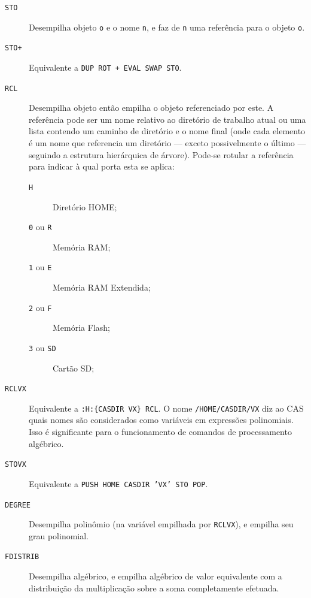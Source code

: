 \documentclass[12pt,a4paper]{report}
\newcommand{\kwd}[1]{\texttt{\textcolor{keyword}{#1}}}
\newcommand{\DUP}{\kwd{DUP}}   %
\newcommand{\SWAP}{\kwd{SWAP}}   %
\newcommand{\ROT}{\kwd{ROT}}   %
\newcommand{\PLUS}{\kwd{+}}   %
\newcommand{\PUSH}{\kwd{PUSH}}   %
\newcommand{\POP}{\kwd{POP}}   %
\newcommand{\HOME}{\kwd{HOME}}   %
\newcommand{\EVAL}{\kwd{EVAL}}   %
\newcommand{\DEGREE}{\kwd{DEGREE}}   %
\newcommand{\FDISTRIB}{\kwd{FDISTRIB}}   %
\newcommand{\STO}{\kwd{STO}} %
\newcommand{\STOPLUS}{\kwd{STO+}} %
\newcommand{\RCL}{\kwd{RCL}} %
\newcommand{\RCLVX}{\kwd{RCLVX}} %
\newcommand{\STOVX}{\kwd{STOVX}} %
\numberwithin{theorem}{chapter}
\begin{document}
\begin{description}

  \item[\STO]\label{STO} Desempilha objeto \texttt{o} e o nome
    \texttt{n}, e faz de \texttt{n} uma referência para o objeto
    \texttt{o}.

  \item[\STOPLUS]\label{STOPLUS} Equivalente a
    \DUP\ \ROT\ \PLUS\ \EVAL\ \SWAP\ \STO.

  \item[\RCL]\label{RCL} Desempilha objeto então empilha o objeto
    referenciado por este.  A referência pode ser um nome relativo ao
    diretório de trabalho atual ou uma lista contendo um caminho de
    diretório e o nome final (onde cada elemento é um nome que
    referencia um diretório --- exceto possivelmente o último ---
    seguindo a estrutura hierárquica de árvore).  Pode-se rotular a
    referência para indicar à qual porta esta se aplica:
    \begin{description}
    \item[\texttt{H}] Diretório HOME;
    \item[\texttt{0} ou \texttt{R}] Memória RAM;
    \item[\texttt{1} ou \texttt{E}] Memória RAM Extendida;
    \item[\texttt{2} ou \texttt{F}] Memória Flash;
    \item[\texttt{3} ou \texttt{SD}] Cartão SD;
    \end{description}

  \item[\RCLVX]\label{RCLVX} Equivalente a \texttt{:H:\{CASDIR VX\}
    \RCL}.  O nome \texttt{/HOME/CASDIR/VX} diz ao CAS quais nomes são
    considerados como variáveis em expressões polinomiais.  Isso é
    significante para o funcionamento de comandos de processamento
    algébrico.

  \item[\STOVX]\label{STOVX} Equivalente a \texttt{\PUSH\ \HOME\ CASDIR 'VX'
    \STO\ \POP}.

  \item[\DEGREE]\label{DEGREE} Desempilha polinômio (na variável
    empilhada por \RCLVX), e empilha seu grau polinomial.

  \item[\FDISTRIB]\label{FDISTRIB} Desempilha algébrico, e empilha
    algébrico de valor equivalente com a distribuição da multiplicação
    sobre a soma completamente efetuada.


\end{description}
\end{document}
